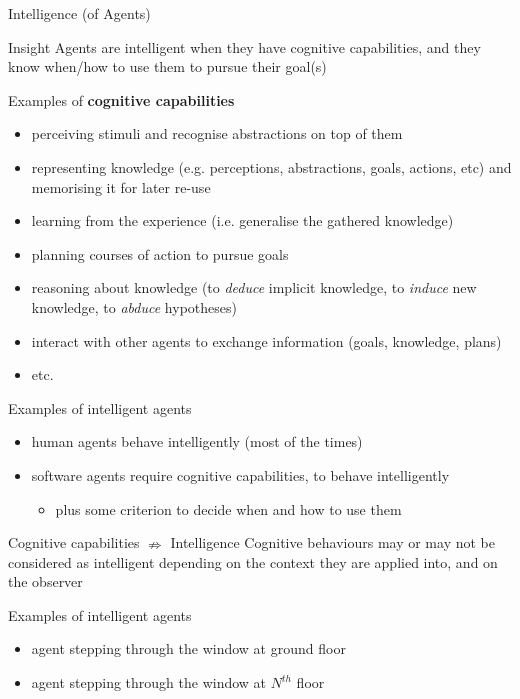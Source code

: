 \documentclass[presentation]{beamer}\mode<presentation>{\usetheme{AMSBolognaFC}}
\begin{document}
\begin{frame}[c,allowframebreaks]{Intelligence (of Agents)}
%
\begin{block}{Insight}
    Agents are \alert{intelligent} when they have \alert{cognitive capabilities}, and they know when/how to use them to pursue their goal(s)
\end{block}
%
\begin{exampleblock}{Examples of \textbf{cognitive capabilities}}\small
    \begin{itemize}
        \item \alert{perceiving} stimuli and \alert{recognise} abstractions on top of them
        \item \alert{representing knowledge} (e.g. perceptions, abstractions, goals, actions, etc) and \alert{memorising} it for later re-use
        \item \alert{learning} from the experience (i.e. generalise the gathered knowledge)
        \item \alert{planning} courses of action to pursue goals
        \item \alert{reasoning} about knowledge (to \emph{deduce} implicit knowledge, to \emph{induce} new knowledge, to \emph{abduce} hypotheses)
        \item \alert{interact} with other agents to exchange information (goals, knowledge, plans)
        \item etc.
    \end{itemize}
\end{exampleblock}
%
\begin{exampleblock}{Examples of intelligent agents}
    \begin{itemize}
        \item human agents behave intelligently (most of the times)
        \item software agents require cognitive capabilities, to behave intelligently
        \begin{itemize}
            \item plus some criterion to decide when and how to use them
        \end{itemize}
    \end{itemize}
\end{exampleblock}
%
\framebreak
%
\begin{alertblock}{Cognitive capabilities $\nRightarrow$ Intelligence}
    Cognitive behaviours may or may not be considered as intelligent depending on the \alert{context} they are applied into, and on the \alert{observer}
\end{alertblock}
%
\begin{exampleblock}{Examples of intelligent agents}
    \begin{itemize}
        \item agent stepping through the window at ground floor
        \item agent stepping through the window at $N^{th}$ floor
    \end{itemize}
\end{exampleblock}
%
\end{frame}
\end{document}
